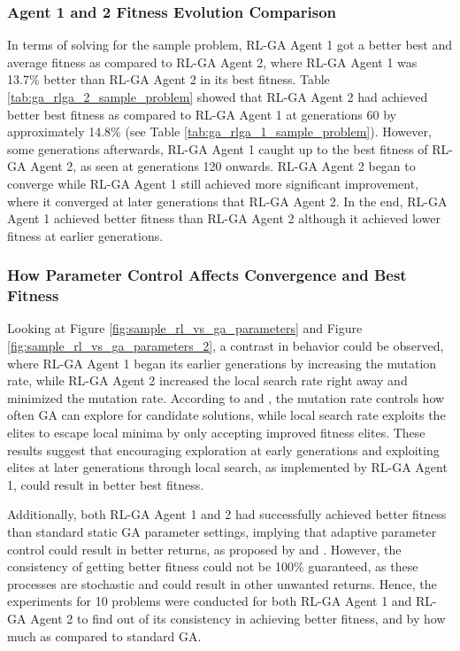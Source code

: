 \documentclass{article}
\begin{document}
\subsubsection{Agent 1 and 2 Fitness Evolution Comparison}
In terms of solving for the sample problem, RL-GA Agent 1 got a better best and average fitness as compared to RL-GA Agent 2, where RL-GA Agent 1 was 13.7\% better than RL-GA Agent 2 in its best fitness. Table \ref{tab:ga_rlga_2_sample_problem} showed that RL-GA Agent 2 had achieved better best fitness as compared to RL-GA Agent 1 at generations 60 by approximately 14.8\% (see Table \ref{tab:ga_rlga_1_sample_problem}). However, some generations afterwards, RL-GA Agent 1 caught up to the best fitness of RL-GA Agent 2, as seen at generations 120 onwards. RL-GA Agent 2 began to converge while RL-GA Agent 1 still achieved more significant improvement, where it converged at later generations that RL-GA Agent 2. In the end, RL-GA Agent 1 achieved better fitness than RL-GA Agent 2 although it achieved lower fitness at earlier generations.

\subsubsection{How Parameter Control Affects Convergence and Best Fitness}
Looking at Figure \ref{fig:sample_rl_vs_ga_parameters} and Figure \ref{fig:sample_rl_vs_ga_parameters_2}, a contrast in behavior could be observed, where RL-GA Agent 1 began its earlier generations by increasing the mutation rate, while RL-GA Agent 2 increased the local search rate right away and minimized the mutation rate. According to \textcite{eiben1999parametercontrol} and \textcite{karafotias2015trends}, the mutation rate controls how often GA can explore for candidate solutions, while local search rate exploits the elites to escape local minima by only accepting improved fitness elites. These results suggest that encouraging exploration at early generations and exploiting elites at later generations through local search, as implemented by RL-GA Agent 1, could result in better best fitness. 

Additionally, both RL-GA Agent 1 and 2 had successfully achieved better fitness than standard static GA parameter settings, implying that adaptive parameter control could result in better returns, as proposed by \textcite{eiben1999parametercontrol} and \textcite{karafotias2015trends}. However, the consistency of getting better fitness could not be 100\% guaranteed, as these processes are stochastic and could result in other unwanted returns. Hence, the experiments for 10 problems were conducted for both RL-GA Agent 1 and RL-GA Agent 2 to find out of its consistency in achieving better fitness, and by how much as compared to standard GA.
\end{document}
